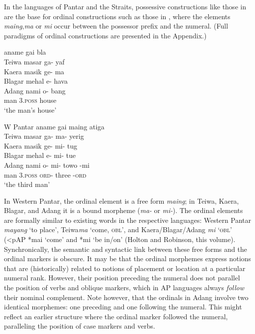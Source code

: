\documentclass[output=paper]{LSP/langsci}
\begin{document}
In the languages of Pantar and the Straits, possessive constructions like those in  are the base for ordinal constructions such as those in , where the elements \textit{maing},\textit{ma} or \textit{mi} occur between the possessor prefix and the numeral. (Full paradigms of ordinal constructions are presented in the Appendix.) 

\ea\label{bkm:Ref342649616}
    aname    gai    bla\\
  Teiwa      masar    ga-    yaf\\
  Kaera      masik    ge-    ma\\
  Blagar      mehal    {\textglotstop}e-    hava\\
  Adang       nami    o-    bang\\
   { }        man   \textsc{3.poss}  house  \\
\glt `the man's house'  \\ 
\z

\ea
\label{bkm:Ref342649632}
\gllllll
      {W Pantar}     aname  gai  maing  atiga \\  
      Teiwa          masar  ga-  ma-  yerig \\
      Kaera          masik  ge-  mi-  tug \\
      Blagar         mehal {\textglotstop}e-  mi-  tue  \\
      Adang          nami  o-  mi-  towo  {}-mi \\      
      { }            man \textsc{3.poss}  \textsc{ord-} three  -\textsc{ord} \\
\glt  `the third man'
\z


In Western Pantar, the ordinal element is a free form \textit{maing}; in Teiwa, Kaera, Blagar, and Adang it is a bound morpheme (\textit{ma-} or \textit{mi-}). The ordinal elements are formally similar to existing words in the respective languages: Western Pantar \textit{mayang} `to place', Teiwa\textit{ma} `come, \textsc{obl}', and Kaera/Blagar/Adang \textit{mi} `\textsc{obl' (}{\textless}pAP *mai `come' and *mi `be in/on' (Holton and Robinson, this volume). Synchronically, the semantic and syntactic link between these free forms and the ordinal markers is obscure. It may be that the ordinal morphemes express notions that are (historically) related to notions of placement or location at a particular numeral rank. However, their position preceding the numeral does not parallel the position of verbs and oblique markers, which in AP languages always \textit{follow} their nominal complement. Note however, that the ordinals in Adang involve two identical morphemes: one preceding and one following the numeral. This might reflect an earlier structure where the ordinal marker followed the numeral, paralleling the position of case markers and verbs.
\end{document}
